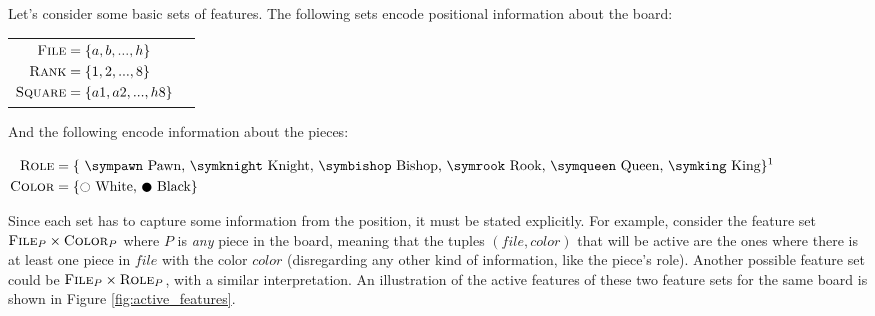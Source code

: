 Let's consider some basic sets of features. The following sets encode positional information about the board:

\begin{center}
\begin{tabular}{cc}

$\begin{aligned}[t]
\textsc{File} &= \{a, b, ..., h\} \\
\textsc{Rank} &= \{1, 2, ..., 8\} \\
\textsc{Square} &= \{a1, a2, ..., h8\}
\end{aligned}$

&

\raisebox{-10ex}{
\chessboard[
    tinyboard,
    showmover=false,
    pgfstyle={text},
    text=\fontsize{1.2ex}{1.2ex}\bfseries\sffamily \currentwq,
    markboard
]
}

\end{tabular}
\end{center}

And the following encode information about the pieces:

\begin{center}
$\begin{aligned}[t]
\fs{Role} &= \text{\{
    \sympawn\ Pawn,
    \symknight\ Knight,
    \symbishop\ Bishop,
    \symrook\ Rook,
    \symqueen\ Queen,
    \symking\ King\}}\textsuperscript{1} \\
\fs{Color} &= \text{\{\white\ White, \black\ Black\}}
\end{aligned}$
\end{center}

Since each set has to capture some information from the position, it must be stated explicitly. For example, consider the feature set $\textsc{File}_{P} \times \textsc{Color}_{P}$ where $P$ is \textit{any} piece in the board, meaning that the tuples $(file, color)$ that will be active are the ones where there is at least one piece in $file$ with the color $color$ (disregarding any other kind of information, like the piece's role). Another possible feature set could be $\textsc{File}_{P} \times \textsc{Role}_{P}$, with a similar interpretation. An illustration of the active features of these two feature sets for the same board is shown in Figure \ref{fig:active_features}.

